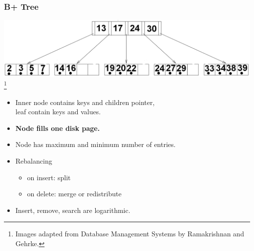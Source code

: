 \documentclass{beamer}
\newcommand\blfootnote[1]{%
  \begingroup
  \renewcommand\thefootnote{}\footnote{#1}%
  \addtocounter{footnote}{-1}%
  \endgroup
}
\begin{document}
    \begin{frame}
      \frametitle{B+ Tree}
      \includegraphics[scale=0.2]{B+Tree.png}
      \blfootnote{\tiny Images adapted from Database Management Systems by Ramakrishnan and Gehrke.}
      \vspace{1em}
      \begin{itemize}
        \item Inner node contains keys and children pointer, \\leaf contain keys and values.
        \item \textbf{Node fills one disk page.}
        \item Node has maximum and minimum number of entries.
        \pause
        \item Rebalancing
          \begin{itemize}
            \item on insert: split
            \item on delete: merge or redistribute
          \end{itemize}
        \pause
        \item Insert, remove, search are logarithmic.
      \end{itemize}
    \end{frame}
\end{document}
